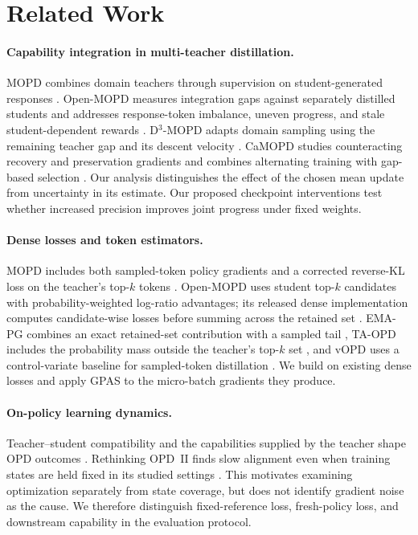 \section{Related Work}

\paragraph{Capability integration in multi-teacher distillation.}
MOPD combines domain teachers through supervision on student-generated
responses \citep{ma2026mopdmultiteacheronpolicydistillation}.
Open-MOPD measures integration gaps against separately distilled students
and addresses response-token imbalance, uneven progress, and stale
student-dependent rewards
\citep{gao2026openmopddiagnosingfixingcapability}.
D$^3$-MOPD adapts domain sampling using the remaining teacher gap and its
descent velocity \citep{sun2026d3mopd}. CaMOPD studies counteracting recovery
and preservation gradients and combines alternating training with
gap-based selection \citep{chen2026camopd}.
Our analysis distinguishes the effect of the chosen mean update from
uncertainty in its estimate. Our proposed checkpoint interventions test
whether increased precision improves joint progress under fixed weights.

\paragraph{Dense losses and token estimators.}
MOPD includes both sampled-token policy gradients and a corrected reverse-KL
loss on the teacher's top-$k$ tokens
\citep{ma2026mopdmultiteacheronpolicydistillation}. Open-MOPD uses student
top-$k$ candidates with probability-weighted log-ratio advantages; its
released dense implementation computes candidate-wise losses before
summing across the retained set
\citep{gao2026openmopddiagnosingfixingcapability,openmopd2026code}.
EMA-PG combines an exact retained-set contribution with a sampled tail
\citep{zhang2026emapg}, TA-OPD includes the probability mass outside the
teacher's top-$k$ set \citep{huang2026tailaware}, and vOPD uses a
control-variate baseline for sampled-token distillation
\citep{oh2026vopd}. We build on existing dense losses and apply GPAS to the
micro-batch gradients they produce.

\paragraph{On-policy learning dynamics.}
Teacher--student compatibility and the capabilities supplied by the teacher
shape OPD outcomes \citep{li2026rethinkingopd}.
Rethinking OPD~II finds slow alignment even when training states are held
fixed in its studied settings \citep{fu2026rethinkingopd2}. This motivates
examining optimization separately from state coverage, but does not
identify gradient noise as the cause. We therefore distinguish
fixed-reference loss, fresh-policy loss, and downstream capability in the
evaluation protocol.


